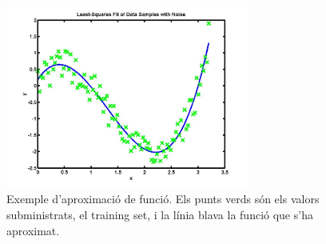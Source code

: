 \begin{figure}[ht!]
\centering
\includegraphics[width=80mm]{data/func_approx.jpg}
\caption{Exemple d'aproximació de funció. Els punts verds són els valors subministrats, el training set,
i la línia blava la funció que s'ha aproximat.}
\label{func_approx}
\end{figure}